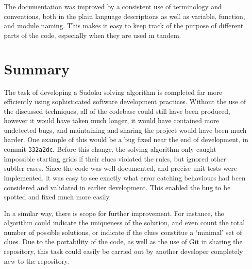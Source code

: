 \documentclass[12pt]{article}
\begin{document}
The documentation was improved by a consistent use of terminology and conventions, both in the plain language descriptions as well as variable, function, and module naming.
This makes it easy to keep track of the purpose of different parts of the code, especially when they are used in tandem.

\section{Summary}

The task of developing a Sudoku solving algorithm is completed far more efficiently using sophisticated software development practices.
Without the use of the discussed techniques, all of the codebase could still have been produced, however it would have taken much longer, it would have contained more undetected bugs, and maintaining and sharing the project would have been much harder.
One example of this would be a bug fixed near the end of development, in commit \texttt{332a2dc}.
Before this change, the solving algorithm only caught impossible starting grids if their clues violated the rules, but ignored other subtler cases.
Since the code was well documented, and precise unit tests were implemented, it was easy to see exactly what error catching behaviours had been considered and validated in earlier development.
This enabled the bug to be spotted and fixed much more easily.

In a similar way, there is scope for further improvement. For instance, the algorithm could indicate the uniqueness of the solution, and even count the total number of possible solutions, or indicate if the clues constitue a `minimal' set of clues.
Due to the portability of the code, as well as the use of Git in sharing the repository, this task could easily be carried out by another developer completely new to the repository.


\end{document}
